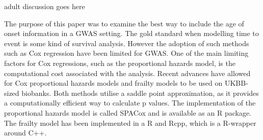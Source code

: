 adult discussion goes here


The purpose of this paper was to examine the best way to include the age of onset information in a GWAS setting. The gold standard when modelling time to event is some kind of survival analysis. However the adoption of such methods such as Cox regression have been limited for GWAS. One of the main limiting factors for Cox regressions, such as the proportional hazards model, is the computational cost associated with the analysis. Recent advances have allowed for Cox proportional hazards models and frailty models to be used on UKBB-sized biobanks. Both methods utilise a saddle point approximation, as it provides a computationally efficient way to calculate p values. The implementation of the proportional hazards model is called SPACox and is available as an R package. The frailty model has been implemented in a R and Rcpp, which is a R-wrapper around C++. 


